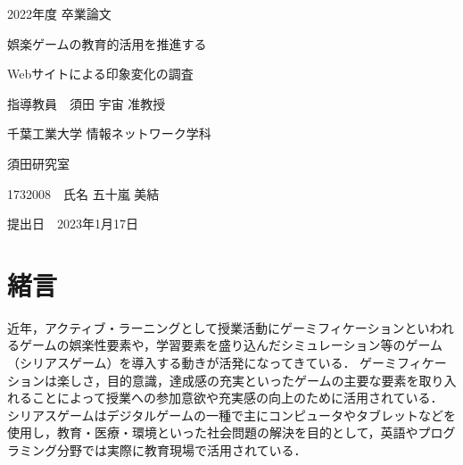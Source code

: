 \documentclass[12pt,a4j,titlepage]{ltjsarticle}
\begin{document}
\begin{titlepage}
  \centering
    \vspace*{40truept}
    {\LARGE 2022年度 卒業論文}
    
    \vspace*{75truept}
    
    {\Huge 娯楽ゲームの教育的活用を推進する}
\vspace*{10truept}

    {\Huge Webサイトによる印象変化の調査}%

    \vspace{85truept}
    
    {\LARGE 指導教員　須田 宇宙 准教授}
    
    \vspace{60truept}
    
    {\LARGE 千葉工業大学 情報ネットワーク学科}
    
    \vspace{15truept}
    
    {\LARGE 須田研究室}
    
    \vspace{70truept}
    
    {\LARGE 1732008　氏名 五十嵐 美結 }　%

    \vspace{70truept}
    
  \begin{flushright}

    \LARGE {提出日　2023年1月17日}
  
  \end{flushright}
\end{titlepage}
\date{}



\tableofcontents
\listoftables
\listoffigures
\clearpage
\section{緒言}\label{緒言}

近年，アクティブ・ラーニングとして授業活動にゲーミフィケーションといわれるゲームの娯楽性要素や，学習要素を盛り込んだシミュレーション等のゲーム（シリアスゲーム）を導入する動きが活発になってきている．
ゲーミフィケーションは楽しさ，目的意識，達成感の充実といったゲームの主要な要素を取り入れることによって授業への参加意欲や充実感の向上のために活用されている．
シリアスゲームはデジタルゲームの一種で主にコンピュータやタブレットなどを使用し，教育・医療・環境といった社会問題の解決を目的として，英語やプログラミング分野では実際に教育現場で活用されている．
\end{document}
